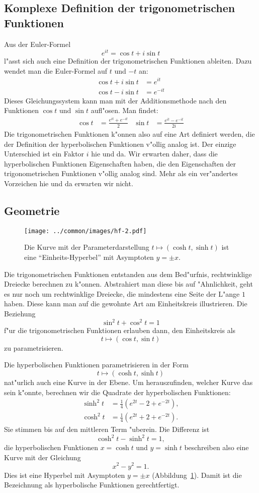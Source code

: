 \documentclass[a4paper,12pt]{article}
\begin{document}
\subsection{Komplexe Definition der trigonometrischen Funktionen}
Aus der Euler-Formel
\[
e^{it}=\cos t+i\sin t
\]
l"asst sich auch eine Definition der trigonometrischen Funktionen
ableiten. Dazu wendet man die Euler-Formel auf $t$ und $-t$ an:
\begin{align*}
\cos t+i\sin t&=e^{it}\\
\cos t-i\sin t&=e^{-it}
\end{align*}
Dieses Gleichungssystem kann man mit der Additionsmethode nach den
Funktionen $\cos t$ und $\sin t$ aufl"osen. Man findet:
\begin{align*}
\cos t
&=
\frac{e^{it}+e^{-it}}2
&
\sin t
&=
\frac{e^{it}-e^{-it}}{2i}
\end{align*}
Die trigonometrischen Funktionen k"onnen also auf eine Art definiert werden,
die der Definition der hyperbolischen Funktionen v"ollig analog ist.
Der einzige Unterschied ist ein Faktor $i$ hie und da.
Wir erwarten daher, dass die hyperbolischen Funktionen Eigenschaften
haben, die den Eigenschaften der trigonometrischen Funktionen v"ollig
analog sind.
Mehr als ein ver"andertes Vorzeichen hie und da erwarten wir nicht.


\subsection{Geometrie}
\begin{figure}
\centering
\texttt{[image: ../common/images/hf-2.pdf]}
\caption{Die Kurve mit der Parameterdarstellung
$t\mapsto (\cosh t, \sinh t)$ ist eine ``Einheits-Hyperbel'' mit 
Asymptoten $y=\pm x$.
\label{anhang:hyperbel}}
\end{figure}
Die trigonometrischen Funktionen entstanden aus dem Bed"urfnis, 
rechtwinklige Dreiecke berechnen zu k"onnen.
Abstrahiert man diese bis auf "Ahnlichkeit, geht es nur noch um rechtwinklige
Dreiecke, die mindestens eine Seite der L"ange $1$ haben.
Diese kann man auf die gewohnte Art am Einheitskreis illustrieren.
Die Beziehung 
\[
\sin^2t+\cos^2t=1
\]
f"ur die trigonometrischen Funktionen erlauben dann, den Einheitskreis als
\[
t\mapsto (\cos t,\sin t)
\]
zu parametrisieren.

Die hyperbolischen Funktionen parametrisieren in der Form
\[
t\mapsto (\cosh t, \sinh t)
\]
nat"urlich auch eine Kurve in der Ebene.
Um herauszufinden, welcher Kurve das sein k"onnte, berechnen wir die 
Quadrate der hyperbolischen Funktionen:
\begin{align}
\sinh^2 t&=\frac14(e^{2t}-2+e^{-2t}),
\\
\cosh^2 t&=\frac14(e^{2t}+2+e^{-2t}).
\label{hyp:definition}
\end{align}
Sie stimmen bis auf den mittleren Term "uberein.
Die Differenz ist 
\[
\cosh^2t - \sinh^2t=1,
\]
die hyperbolischen Funktionen $x=\cosh t$ und $y=\sinh t$
beschreiben also eine Kurve mit der Gleichung
\[
x^2-y^2=1.
\]
Dies ist eine Hyperbel mit Asymptoten $y=\pm x$
(Abbildung~\ref{anhang:hyperbel}).
Damit ist die Bezeichnung als hyperbolische Funktionen gerechtfertigt.
\end{document}
